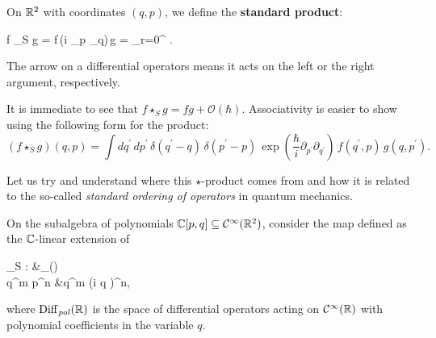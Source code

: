 \documentclass[main.tex]{subfiles}
\begin{document}
\begin{example}
\label{ex:standard_star_product}
	On $\mathbb{R}^2$ with coordinates $(q,p)$, we define the \textbf{standard product}:
	\begin{eqalign}
		f \star_S g = f\,\exp\left(\frac{\planck}i \lpartial_p \rpartial_q\right)\,g = \sum_{r=0}^\infty {}\,\,.
	\end{eqalign}
	The arrow on a differential operators means it acts on the left or the right argument, respectively.


	It is immediate to see that $f\star_S g=fg+\mathcal{O}(\hbar)$.
	Associativity is easier to show using the following form for the product:
	\begin{equation}
		(f\star_S g)(q,p)=\int dq^\prime\, dp^\prime\, \delta(q^\prime-q)\,\delta(p^\prime-p)\,\exp\left(\frac{\hbar}{i}\partial_{p^\prime}\partial_{q^\prime}\right)\,f(q^\prime,p)\,g(q,p^\prime).
	\end{equation}


	Let us try and understand where this $\star$-product comes from and how it is related to the so-called \emph{standard ordering of operators} in quantum mechanics.

	On the subalgebra of polynomials $\mathbb{C}[p,q] \subseteq \mathcal{C}^\infty(\mathbb{R}^2)$, consider the map defined as the $\mathbb{C}$-linear extension of
	\begin{eqalign}
		\rho_S : \C[p,q] &\longto \Diff_{}(\R)\\
		q^m p^n &\longmapsto q^m \left(\frac{\planck}i \pder{}q \right)^n,
	\end{eqalign}
	where $\mathrm{Diff}_{\mathit{pol}}(\mathbb{R})$ is the space of differential operators acting on $\mathcal{C}^\infty(\mathbb{R})$ with polynomial
	coefficients in the variable $q$.


\end{example}
\end{document}
